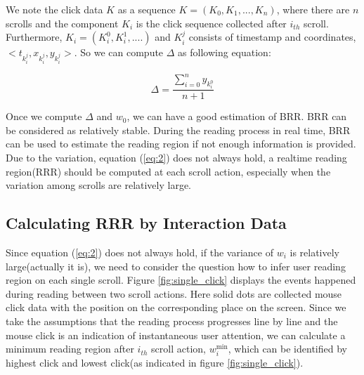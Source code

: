 \documentclass{sigchi}
\begin{document}
We note the click data $K$ as a sequence $K=(K_0,K_1,...,K_n)$, where 
there are $n$ scrolls and the component $K_i$ is the click sequence collected 
after $i_{th}$ scroll. Furthermore, $K_i= (K_i^0,K_i^1,....)$ and $K_i^j$ consists
of timestamp and coordinates, $< {t_{k_i^j}},{x_{k_i^j}},{y_{k_i^j}}>$. So we 
can compute $\Delta$ as following equation:

\begin{equation} \label{eq:31}
\Delta  = \frac{{\sum\limits_{i = 0}^n {{y_{k_i^0}}} }}{{n + 1}}
\end{equation} 

Once we compute $\Delta$ and $w_0$, we can have a good estimation of BRR. BRR can be considered as 
relatively stable. During the reading process in real time, BRR can be used to estimate the reading region if not 
enough information is provided. Due to the variation, equation (\ref{eq:2}) does not always hold, a realtime reading
region(RRR) should be computed at each scroll action, especially when the variation among scrolls are relatively large. 

\subsection{ Calculating RRR by Interaction Data }

Since equation (\ref{eq:2}) does not always hold, if the variance of $w_i$ is relatively large(actually it is),
we need to consider the question how to infer user reading  region on each single scroll. Figure \ref{fig:single_click}
displays the events happened during  reading between two scroll actions. Here solid dots are collected mouse click data with
the position on the corresponding place on the screen. Since we take the assumptions that the reading process progresses 
line by line and the mouse click is an indication of instantaneous user attention, we can calculate a minimum reading region after $i_{th}$ scroll action, 
$w_i^{\min }$, which can be identified by highest click and lowest click(as indicated in figure \ref{fig:single_click}). 
\end{document}

